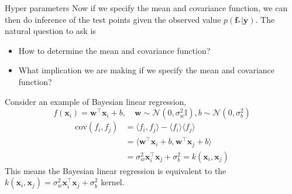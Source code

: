 \documentclass{beamer}
\begin{document}
\begin{frame}[allowframebreaks]{Hyper parameters}
Now if we specify the mean and covariance function, we can then do inference of the test points given the observed value $p(\mathbf{f}_\ast | \mathbf{y})$.
The natural question to ask is 
\begin{itemize}
\item How to determine the mean and covariance function?
\item What implication we are making if we specify the mean and covariance function?
\end{itemize}
Consider an example of Bayesian linear regression,
$$f(\mathbf{x}_i) = \mathbf{w}^\top \mathbf{x}_i + b, \quad \mathbf{w} \sim \mathcal{N}(0, \sigma_w^2 \mathbb{I}), b \sim \mathcal{N}(0, \sigma_b^2)$$
\begin{align*}
\text{cov}(f_i, f_j) & = \langle f_i, f_j \rangle - \langle f_i \rangle \langle f_j \rangle \\ 
& = \langle \mathbf{w}^\top \mathbf{x}_i + b, \mathbf{w}^\top \mathbf{x}_j + b \rangle \\
& = \sigma_w^2 \mathbf{x}_i^\top \mathbf{x}_j + \sigma_b^2 = k(\mathbf{x}_i, \mathbf{x}_j)
\end{align*}
This means the Bayesian linear regression is equivalent to the $k(\mathbf{x}_i, \mathbf{x}_j) = \sigma_w^2 \mathbf{x}_i^\top \mathbf{x}_j + \sigma_b^2$ kernel. 




\end{frame}
\end{document}
